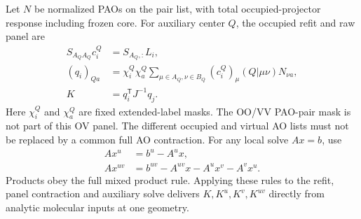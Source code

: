 \documentclass[11pt]{article}
\begin{document}
Let $N$ be normalized PAOs on the pair list, with total occupied-projector
response including frozen core. For auxiliary center $Q$, the occupied
refit and raw panel are
\begin{align}
 S_{A_QA_Q}c_i^{Q}&=S_{A_Q,:}L_i,\\
 (q_i)_{Qa}&=\chi_i^Q\chi_a^Q
 \sum_{\mu\in A_Q,\nu\in B_Q}
 (c_i^Q)_\mu (Q|\mu\nu)N_{\nu a},\\
 K&=q_i^{\mathsf T}J^{-1}q_j .
\end{align}
Here $\chi_i^Q$ and $\chi_a^Q$ are fixed extended-label masks. The OO/VV
PAO-pair mask is not part of this OV panel. The different occupied and
virtual AO lists must not be replaced by a common full AO contraction.
For any local solve $A x=b$, use
\begin{align}
 A x^u&=b^u-A^u x,\\
 A x^{uv}&=b^{uv}-A^{uv}x-A^u x^v-A^v x^u.
\end{align}
Products obey the full mixed product rule. Applying these rules to the refit,
panel contraction and auxiliary solve delivers $K,K^u,K^v,K^{uv}$ directly
from analytic molecular inputs at one geometry.
\end{document}
